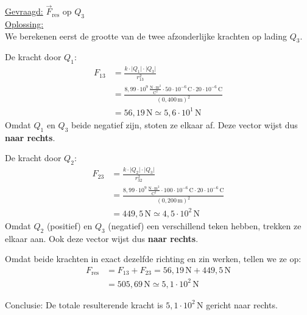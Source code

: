 \documentclass{ximera}
\begin{document}
\begin{exercise}
\begin{solution}
        \underline{Gevraagd:} $\vec{F}_{\text{res}}$ op \(Q_{3}\) \\

        \underline{Oplossing:}\\
        We berekenen eerst de grootte van de twee afzonderlijke krachten op lading $Q_3$.
        
        De kracht door $Q_1$:
        \begin{align*}
            F_{13}&= \frac{k\cdot \lvert Q_{1}\rvert\cdot \lvert Q_{3}\rvert}{r_{13}^{2}}\\
            &= \frac{8{,}99 \cdot 10^9 \, \mathrm{\frac{N \cdot m^2}{C^2}} \cdot 50 \cdot 10^{-6} \, \mathrm{C} \cdot 20 \cdot 10^{-6} \, \mathrm{C}}{(0{,}400 \, \mathrm{m})^2} \\
            &= 56{,}19 \, \mathrm{N} \simeq 5{,}6\cdot 10^{1} \, \mathrm{N}
        \end{align*}
        Omdat $Q_1$ en $Q_3$ beide negatief zijn, stoten ze elkaar af. Deze vector wijst dus \textbf{naar rechts}.
        
        De kracht door $Q_2$:
        \begin{align*}
            F_{23}&= \frac{k\cdot \lvert Q_{2}\rvert\cdot \lvert Q_{3}\rvert}{r_{32}^{2}}\\
            &= \frac{8{,}99 \cdot 10^9 \, \mathrm{\frac{N \cdot m^2}{C^2}} \cdot 100 \cdot 10^{-6} \, \mathrm{C} \cdot 20 \cdot 10^{-6} \, \mathrm{C}}{(0{,}200 \, \mathrm{m})^2} \\
            &= 449{,}5 \, \mathrm{N}\simeq 4{,}5\cdot 10^{2} \, \mathrm{N}
        \end{align*}
        Omdat $Q_2$ (positief) en $Q_3$ (negatief) een verschillend teken hebben, trekken ze elkaar aan. Ook deze vector wijst dus \textbf{naar rechts}.
        
        Omdat beide krachten in exact dezelfde richting en zin werken, tellen we ze op:
        \begin{align*}
            F_{\text{res}} &= F_{13} + F_{23} = 56{,}19 \, \mathrm{N} + 449{,}5 \, \mathrm{N}\\
             &= 505{,}69 \, \mathrm{N} \simeq \boxed{5{,}1\cdot 10^{2} \, \mathrm{N}}
        \end{align*}
            
        
        
        Conclusie: De totale resulterende kracht is $5{,}1\cdot 10^{2}\, \mathrm{N}$ gericht naar rechts.
    \end{solution}
\end{exercise}
\end{document}
